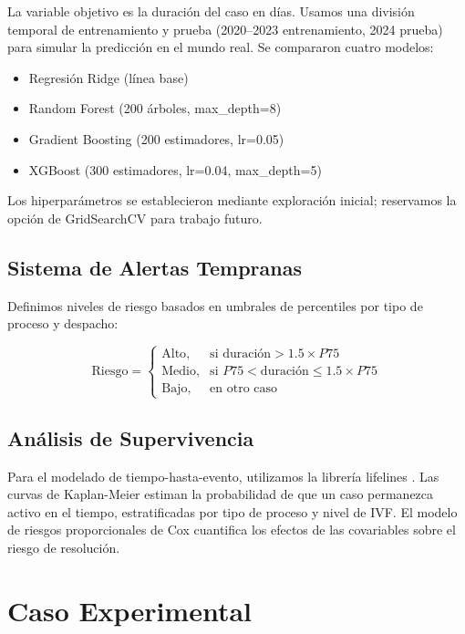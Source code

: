 \documentclass[runningheads]{llncs}
\begin{document}
La variable objetivo es la duraci\'{o}n del caso en d\'{i}as. Usamos una divisi\'{o}n temporal de entrenamiento y prueba (2020--2023 entrenamiento, 2024 prueba) para simular la predicci\'{o}n en el mundo real. Se compararon cuatro modelos:

\begin{itemize}
    \item Regresi\'{o}n Ridge (l\'{i}nea base)
    \item Random Forest (200 \'{a}rboles, max\_depth=8)
    \item Gradient Boosting (200 estimadores, lr=0.05)
    \item XGBoost (300 estimadores, lr=0.04, max\_depth=5)
\end{itemize}

Los hiperpar\'{a}metros se establecieron mediante exploraci\'{o}n inicial; reservamos la opci\'{o}n de GridSearchCV para trabajo futuro.

\subsection{Sistema de Alertas Tempranas}

Definimos niveles de riesgo basados en umbrales de percentiles por tipo de proceso y despacho:

\begin{equation}
\text{Riesgo} =
\begin{cases}
\text{Alto}, & \text{si duraci\'{o}n} > 1.5 \times P75 \\
\text{Medio}, & \text{si } P75 < \text{duraci\'{o}n} \leq 1.5 \times P75 \\
\text{Bajo}, & \text{en otro caso}
\end{cases}
\label{eq:risk}
\end{equation}

\subsection{An\'{a}lisis de Supervivencia}

Para el modelado de tiempo-hasta-evento, utilizamos la librer\'{i}a lifelines \cite{davidson2019lifelines}. Las curvas de Kaplan-Meier estiman la probabilidad de que un caso permanezca activo en el tiempo, estratificadas por tipo de proceso y nivel de IVF. El modelo de riesgos proporcionales de Cox cuantifica los efectos de las covariables sobre el riesgo de resoluci\'{o}n.

\section{Caso Experimental}
\end{document}
